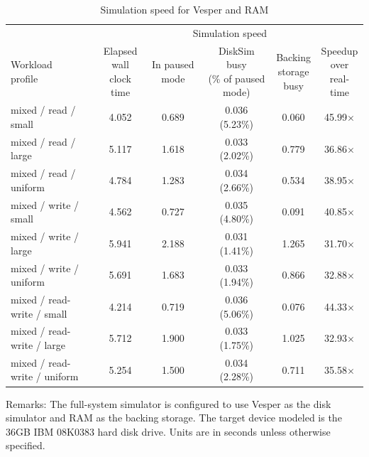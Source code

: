 \begin{table}[htbp]%
	\small
	\begin{center}
	\caption{Simulation speed for Vesper and RAM}\label{tab:Vesper-and-RAM-speed}
	\hspace*{-2cm}
	\noindent\begin{tabular}{lccccc}
		\toprule
		& \multicolumn{5}{c}{Simulation speed} \\
		\cmidrule(lr){2-6}
		\parbox{3cm}{\centering Workload \\ profile} & \parbox{1.8cm}{\centering Elapsed \\ wall clock \\ time } & \parbox{1.2cm}{\centering In paused mode } & \parbox{3.2cm}{\centering DiskSim busy \\ (\% of paused mode)} & \parbox{1.2cm}{\centering Backing \\ storage \\ busy} & \parbox{1.5cm}{\centering Speedup \\ over \\ real-time}\\
		
		\midrule
		
		mixed / read / small & 4.052 & 0.689 & 0.036 (5.23\%) & 0.060 & 45.99$\times$ \\
		mixed / read / large & 5.117 & 1.618 & 0.033 (2.02\%) & 0.779 & 36.86$\times$ \\
		mixed / read / uniform & 4.784 & 1.283 & 0.034 (2.66\%) & 0.534 & 38.95$\times$ \\
		mixed / write / small & 4.562 & 0.727 & 0.035 (4.80\%) & 0.091 & 40.85$\times$ \\
		mixed / write / large & 5.941 & 2.188 & 0.031 (1.41\%) & 1.265 & 31.70$\times$ \\
		mixed / write / uniform & 5.691 & 1.683 & 0.033 (1.94\%) & 0.866 & 32.88$\times$ \\
		mixed / read-write / small & 4.214 & 0.719 & 0.036 (5.06\%) & 0.076 & 44.33$\times$ \\
		mixed / read-write / large & 5.712 & 1.900 & 0.033 (1.75\%) & 1.025 & 32.93$\times$ \\
		mixed / read-write / uniform & 5.254 & 1.500 & 0.034 (2.28\%) & 0.711 & 35.58$\times$\\
		
		\bottomrule
	\end{tabular} 
	\hspace*{-2cm}
	\end{center}

	Remarks: The full-system simulator is configured to use Vesper as the disk simulator and RAM as the backing storage. The target device modeled is the 36GB IBM 08K0383 hard disk drive. Units are in seconds unless otherwise specified.
\end{table}%


